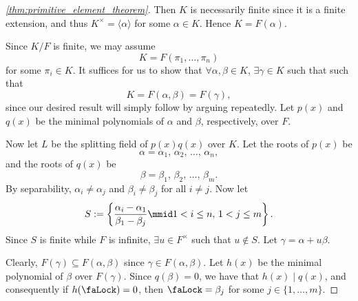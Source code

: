 \documentclass[notoc,notitlepage]{tufte-book}
\begin{document}
\begin{proof}[\cref{thm:primitive_element_theorem}]
   Then $K$ is necessarily finite since it is a finite
  extension, and thus $K^\times = \langle \alpha \rangle$ for some $\alpha \in
  K$. Hence $K = F(\alpha)$.

  \noindent
   Since $K / F$ is finite, we may assume
  \begin{equation*}
    K = F(\pi_1, \ldots, \pi_n)
  \end{equation*}
  for some $\pi_i \in K$. It suffices for us to show that $\forall \alpha, \beta
  \in K$, $\exists \gamma \in K$ such that
  such that
  \begin{equation*}
    K = F(\alpha, \beta) = F(\gamma),
  \end{equation*}
  since our desired result will simply follow by arguing repeatedly. Let $p(x)$
  and $q(x)$ be the minimal polynomials of $\alpha$ and $\beta$, respectively,
  over $F$.
  
  Now let $L$ be the splitting field of $p(x) q(x)$ over $K$. Let the roots of
  $p(x)$ be
  \begin{equation*}
    \alpha = \alpha_1, \, \alpha_2, \, \ldots, \, \alpha_n,
  \end{equation*}
  and the roots of $q(x)$ be
  \begin{equation*}
    \beta = \beta_1, \, \beta_2, \, \ldots, \, \beta_m.
  \end{equation*}
  By separability, $\alpha_i \neq \alpha_j$ and $\beta_i \neq \beta_j$ for all
  $i \neq j$. Now let 
  \begin{equation*}
    S := \left\{ \frac{\alpha_i - \alpha_1}{\beta_1 - \beta_j} \mmid 1 < i \leq
    n, \, 1 < j \leq m \right\}.
  \end{equation*}
  Since $S$ is finite while $F$ is infinite, $\exists u \in F^\times$ such that
  $u \notin S$. Let $\gamma = \alpha + u \beta$.

  \noindent
   Clearly, $F(\gamma) \subseteq
  F(\alpha, \beta)$ since $\gamma \in F(\alpha, \beta)$. Let $h(x)$ be the
  minimal polynomial of $\beta$ over $F(\gamma)$. Since $q(\beta) = 0$, we have
  that $h(x) \mid q(x)$, and consequently if $h(\faLock) = 0$, then $\faLock =
  \beta_j$ for some $j \in \{ 1, \ldots, m \}$.


\end{proof}
\end{document}
